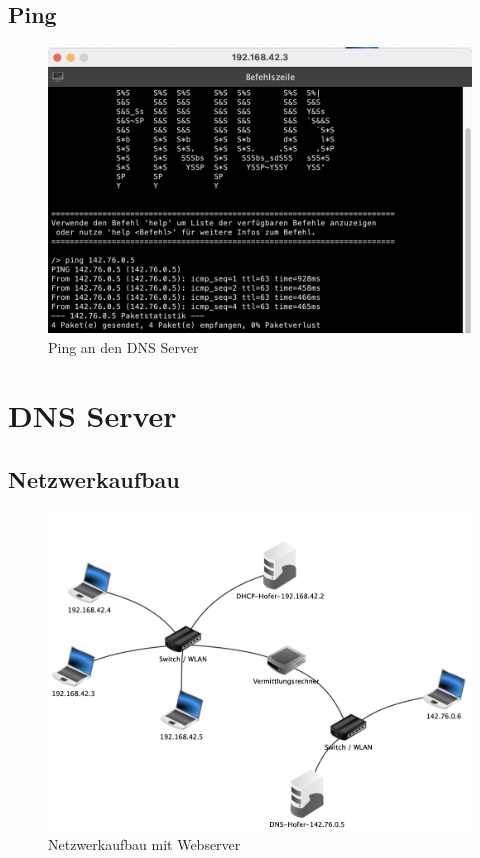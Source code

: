 \documentclass{article}
\begin{document}
	\subsection{Ping}
	\begin{figure}[H]
	\centering
	\includegraphics[scale=0.4]{2.4.png}
	\caption{Ping an den DNS Server}
	\end{figure}
	\section{DNS Server}
	\subsection{Netzwerkaufbau}
	\begin{figure}[H]
	\centering
	\includegraphics[scale=0.4]{3.1.png}
	\caption{Netzwerkaufbau mit Webserver}
	\end{figure}
\end{document}
